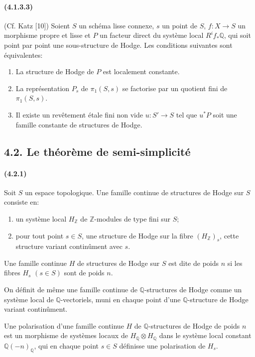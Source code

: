 \documentclass[10pt]{article}
\newcommand{\Q}{\mathbb Q}
\newcommand{\Z}{\mathbb Z}
\begin{document}
\paragraph{(4.1.3.3)} (Cf. Katz [10]) Soient $S$ un schéma lisse connexe, $s$ un point de $S$, $f:X\to S$ un morphisme propre et lisse et $P$ un facteur direct du système local $R^if_*\Q$, qui soit point par point une sous-structure de Hodge. Les conditions suivantes sont équivalentes:
\begin{enumerate}[label=\alph*)]
\item La structure de Hodge de $P$ est localement constante.
\item La représentation $P_s$ de $\pi_1(S,s)$ se factorise par un quotient fini de $\pi_1(S,s)$.
\item Il existe un revêtement étale fini non vide $u:S'\to S$ tel que $u^*P$ soit une famille constante de structures de Hodge.
\end{enumerate}

\subsection*{4.2. Le théorème de semi-simplicité}

\paragraph{(4.2.1)} Soit $S$ un espace topologique. Une famille continue de structures de Hodge sur $S$ consiste en:
\begin{enumerate}[label=\alph*)]
\item un système local $H_\Z$ de $\Z$-modules de type fini sur $S$;
\item pour tout point $s\in S$, une structure de Hodge sur la fibre $(H_\Z)_s$, cette structure variant continûment avec $s$.
\end{enumerate}
Une famille continue $H$ de structures de Hodge sur $S$ est dite de poids $n$ si les fibres $H_s$ $(s\in S)$ sont de poids $n$.

On définit de même une famille continue de $\Q$-structures de Hodge comme un système local de $\Q$-vectoriels, muni en chaque point d'une $\Q$-structure de Hodge variant continûment.

Une polarisation d'une famille continue $H$ de $\Q$-structures de Hodge de poids $n$ est un morphisme de systèmes locaux de $H_\Q\otimes H_\Q$ dans le système local constant $\Q(-n)_\Q$, qui en chaque point $s\in S$ définisse une polarisation de $H_s$.
\end{document}
